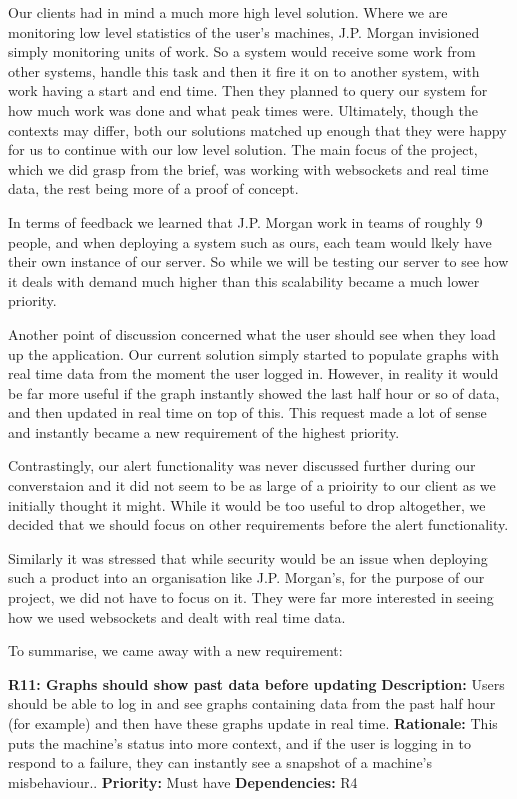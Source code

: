 \documentclass{l3proj}
\begin{document}
Our clients had in mind a much more high level solution. Where we are monitoring low level statistics of the user's machines, J.P. Morgan invisioned simply monitoring units of work. So a system would receive some work from other systems, handle this task and then it fire it on to another system, with work having a start and end time. Then they planned to query our system for how much work was done and what peak times were. Ultimately, though the contexts may differ, both our solutions matched up enough that they were happy for us to continue with our low level solution. The main focus of the project, which we did grasp from the brief, was working with websockets and real time data, the rest being more of a proof of concept.

In terms of feedback we learned that J.P. Morgan work in teams of roughly 9 people, and when deploying a system such as ours, each team would lkely have their own instance of our server. So while we will be testing our server to see how it deals with demand much higher than this scalability became a much lower priority.

Another point of discussion concerned what the user should see when they load up the application. Our current solution simply started to populate graphs with real time data from the moment the user logged in. However, in reality it would be far more useful if the graph instantly showed the last half hour or so of data, and then updated in real time on top of this. This request made a lot of sense and instantly became a new requirement of the highest priority.

Contrastingly, our alert functionality was never discussed further during our converstaion and it did not seem to be as large of a prioirity to our client as we initially thought it might. While it would be too useful to drop altogether, we decided that we should focus on other requirements before the alert functionality.

Similarly it was stressed that while security would be an issue when deploying such a product into an organisation like J.P. Morgan's, for the purpose of our project, we did not have to focus on it. They were far more interested in seeing how we used websockets and dealt with real time data.

To summarise, we came away with a new requirement:

\textbf{R11: Graphs should show past data before updating} \newline
\textbf{Description:} Users should be able to log in and see graphs containing data from the past half hour (for example) and then have these graphs update in real time. \newline
\textbf{Rationale:} This puts the machine's status into more context, and if the user is logging in to respond to a failure, they can instantly see a snapshot of a machine's misbehaviour.. \newline
\textbf{Priority:} Must have \newline
\textbf{Dependencies:} R4
\end{document}
